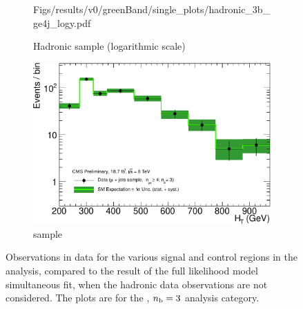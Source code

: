 \begin{figure}[h!]
\begin{subfigure}[b]{0.48\textwidth}
    {Figs/results/v0/greenBand/single_plots/hadronic_3b_ge4j_logy.pdf}
    \caption{Hadronic sample (logarithmic scale)}
  \end{subfigure}
  \begin{subfigure}[b]{0.48\textwidth}
    \includegraphics[width=\textwidth]
    {Figs/results/v0/greenBand/single_plots/muon_3b_ge4j_logy.pdf}
    \caption{\mj sample}
  \end{subfigure}
  \caption{Observations in data for the various signal and control
  regions in the analysis, compared to the result of the full likelihood model
  simultaneous fit, when the hadronic data observations are not considered. The
  plots are for the \njhigh, $n_{\text{b}} = 3$ analysis category.}
  \label{fig:green_fits_3b_ge4j}
\end{figure}


